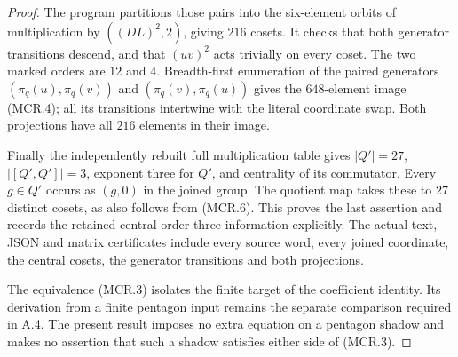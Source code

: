 \begin{proof}
The program partitions those pairs into the six-element
orbits of multiplication by $((DL)^2,2)$, giving $216$
cosets.  It checks that both generator transitions descend,
and that $(uv)^2$ acts trivially on every coset.  The two
marked orders are $12$ and $4$.  Breadth-first enumeration
of the paired generators $(\pi_q(u),\pi_q(v))$ and
$(\pi_q(v),\pi_q(u))$ gives the $648$-element image (MCR.4);
all its transitions intertwine with the literal coordinate
swap.  Both projections have all $216$ elements in their
image.

Finally the independently rebuilt full multiplication table
gives $|Q'|=27$, $|[Q',Q']|=3$, exponent three for $Q'$,
and centrality of its commutator.  Every $g\in Q'$ occurs
as $(g,0)$ in the joined group.  The quotient map takes these
to $27$ distinct cosets, as also follows from (MCR.6).
This proves the last assertion and records the retained
central order-three information explicitly.  The actual
text, JSON and matrix certificates include every source
word, every joined coordinate, the central cosets, the
generator transitions and both projections.

The equivalence (MCR.3) isolates the finite target of the
coefficient identity.  Its derivation from a finite pentagon
input remains the separate comparison required in A.4.
The present result imposes no extra equation on a pentagon
shadow and makes no assertion that such a shadow satisfies
either side of (MCR.3).
\end{proof}
